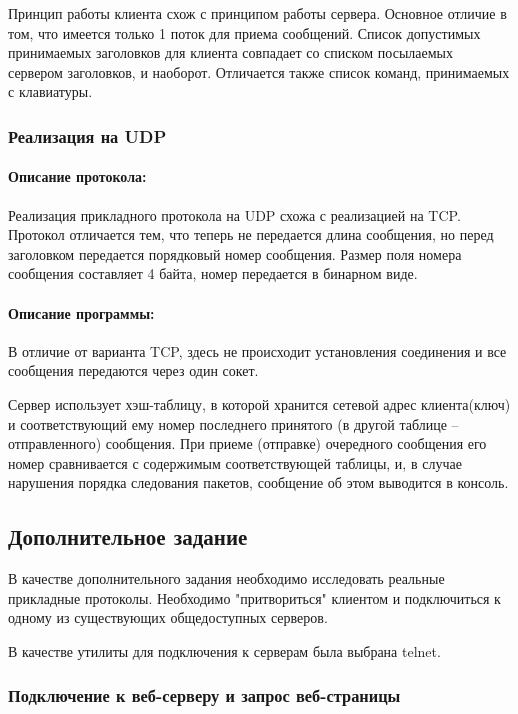 Принцип работы клиента схож с принципом работы сервера. Основное отличие в том, что имеется только 1 поток для приема сообщений. Список допустимых принимаемых заголовков для клиента совпадает со списком посылаемых сервером заголовков, и наоборот. Отличается также список команд, принимаемых с клавиатуры.

\subsubsection{Реализация на UDP}

\paragraph{Описание протокола:}

Реализация прикладного протокола на UDP схожа с реализацией на TCP. Протокол отличается тем, что теперь не передается длина сообщения, но перед заголовком передается порядковый номер сообщения. Размер поля номера сообщения составляет 4 байта, номер передается в бинарном виде.

\paragraph{Описание программы:}

В отличие от варианта TCP, здесь не происходит установления соединения и все сообщения передаются через один сокет.

Сервер использует хэш-таблицу, в которой хранится сетевой адрес клиента(ключ) и соответствующий ему номер последнего принятого (в другой таблице -- отправленного) сообщения. При приеме (отправке) очередного сообщения его номер сравнивается с содержимым соответствующей таблицы, и, в случае нарушения порядка следования пакетов, сообщение об этом выводится в консоль.

\subsection{Дополнительное задание}

В качестве дополнительного задания необходимо исследовать реальные прикладные протоколы. Необходимо "притвориться" клиентом и подключиться к одному из существующих общедоступных серверов.

В качестве утилиты для подключения к серверам была выбрана telnet.

\subsubsection{Подключение к веб-серверу и запрос веб-страницы}


